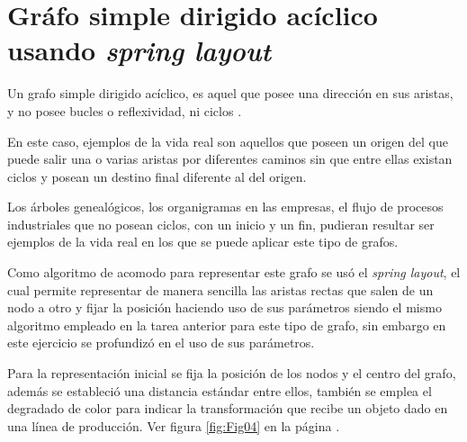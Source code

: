 \documentclass{article}
\begin{document}
\section{Gráfo simple dirigido acíclico usando \textit{spring layout}}

Un grafo simple dirigido acíclico, es aquel que posee una dirección en sus aristas, y no posee bucles o reflexividad, ni ciclos \cite{Elisa}.
 
En este caso, ejemplos de la vida real son aquellos que poseen un origen del que puede salir una o varias aristas por diferentes caminos sin que entre ellas existan ciclos y posean un destino final diferente al del origen. 

Los árboles genealógicos, los organigramas en las empresas, el flujo de procesos industriales que no posean ciclos, con un inicio y un fin, pudieran resultar ser ejemplos de la vida real en los que se puede aplicar este tipo de grafos. 

Como algoritmo de acomodo para representar este grafo se usó el \textit{spring layout}, el cual permite representar de manera sencilla las aristas rectas que salen de un nodo a otro y fijar la posición haciendo uso de sus parámetros \cite{layout} siendo el mismo algoritmo empleado en la tarea anterior para este tipo de grafo, sin embargo en este ejercicio se profundizó en el uso de sus parámetros. 

Para la representación inicial se fija la posición de los nodos y el centro del grafo, además se estableció una distancia estándar entre ellos, también se emplea el degradado de color para indicar la transformación que recibe un objeto dado en una línea de producción. Ver figura \ref{fig:Fig04} en la página \pageref{fig:Fig04}.

\newpage

\end{document}
